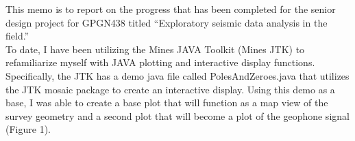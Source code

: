 \documentclass[a4paper,11pt]{texMemo}
\begin{document}
\maketitle

This memo is to report on the progress that has been completed for the senior design project for GPGN438 titled ``Exploratory seismic data analysis in the field.'' \\

To date, I have been utilizing the Mines JAVA Toolkit (Mines JTK) to refamiliarize myself with JAVA plotting and interactive display functions. Specifically, the JTK has a demo java file called PolesAndZeroes.java that utilizes the JTK mosaic package to create an interactive display. Using this demo as a base, I was able to create a base plot that will function as a map view of the survey geometry and a second plot that will become a plot of the geophone signal (Figure 1). \\
\end{document}

